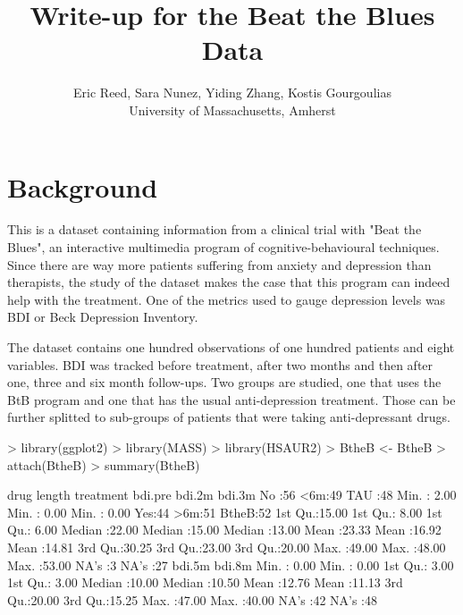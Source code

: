 \documentclass{article}
\begin{document}

\title{Write-up for the Beat the Blues Data}
\author{Eric Reed, Sara Nunez, Yiding Zhang, Kostis Gourgoulias\\
University of Massachusetts, Amherst}
\maketitle
\newpage
\section{Background}
This is a dataset containing information from a clinical trial with "Beat the Blues", an interactive
multimedia program of cognitive-behavioural techniques. Since there are way more patients suffering from anxiety
and depression than therapists, the study of the dataset makes the case that this program can indeed help with
the treatment. One of the metrics used to gauge depression levels was BDI or Beck Depression Inventory.

The dataset contains one hundred observations of one hundred patients and eight variables.
BDI was tracked before treatment, after two months and then after one, three and six month follow-ups.
Two groups are studied, one that uses the BtB program and one that has the usual anti-depression treatment.
Those can be further splitted to sub-groups of patients that were taking anti-depressant drugs.

\begin{Schunk}
\begin{Sinput}
> library(ggplot2)
> library(MASS)
> library(HSAUR2)
> BtheB <- BtheB
> attach(BtheB)
> summary(BtheB)
\end{Sinput}
\begin{Soutput}
  drug    length   treatment     bdi.pre          bdi.2m          bdi.3m     
 No :56   <6m:49   TAU  :48   Min.   : 2.00   Min.   : 0.00   Min.   : 0.00  
 Yes:44   >6m:51   BtheB:52   1st Qu.:15.00   1st Qu.: 8.00   1st Qu.: 6.00  
                              Median :22.00   Median :15.00   Median :13.00  
                              Mean   :23.33   Mean   :16.92   Mean   :14.81  
                              3rd Qu.:30.25   3rd Qu.:23.00   3rd Qu.:20.00  
                              Max.   :49.00   Max.   :48.00   Max.   :53.00  
                                              NA's   :3       NA's   :27     
     bdi.5m          bdi.8m     
 Min.   : 0.00   Min.   : 0.00  
 1st Qu.: 3.00   1st Qu.: 3.00  
 Median :10.00   Median :10.50  
 Mean   :12.76   Mean   :11.13  
 3rd Qu.:20.00   3rd Qu.:15.25  
 Max.   :47.00   Max.   :40.00  
 NA's   :42      NA's   :48     
\end{Soutput}
\end{Schunk}
\end{document}
